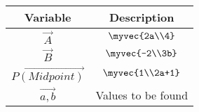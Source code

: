 \begin{tabular}[12pt]{ |c| c|}
    \hline
    \textbf{Variable} & \textbf{Description}\\ 
    \hline
	$\vec{A}$ & $\myvec{2a\\4}$\\
	\hline
	$\vec{B}$ & $\myvec{-2\\3b}$\\
	\hline
	$\vec{P(Midpoint)}$ & $\myvec{1\\2a+1}$\\
	\hline
	$\vec{a,b}$ & Values to be found\\
        \hline
\end{tabular}
